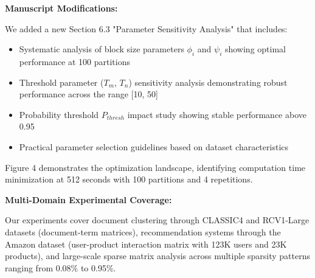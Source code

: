 \documentclass{ar2rc}
\begin{document}


\textbf{Manuscript Modifications:}

We added a new Section 6.3 "Parameter Sensitivity Analysis" that includes:

\begin{itemize}
  \item Systematic analysis of block size parameters $\phi_i$ and $\psi_i$ showing optimal performance at 100 partitions
  \item Threshold parameter ($T_m$, $T_n$) sensitivity analysis demonstrating robust performance across the range [10, 50]
  \item Probability threshold $P_{thresh}$ impact study showing stable performance above 0.95
  \item Practical parameter selection guidelines based on dataset characteristics
\end{itemize}

Figure 4 demonstrates the optimization landscape, identifying computation time minimization at 512 seconds with 100 partitions and 4 repetitions.



\textbf{Multi-Domain Experimental Coverage:}

Our experiments cover document clustering through CLASSIC4 and RCV1-Large datasets (document-term matrices), recommendation systems through the Amazon dataset (user-product interaction matrix with 123K users and 23K products), and large-scale sparse matrix analysis across multiple sparsity patterns ranging from 0.08\% to 0.95\%.
\end{document}
